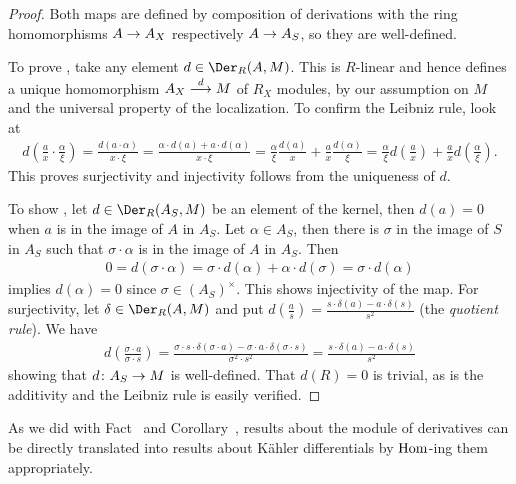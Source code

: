 \documentclass[a4paper,parskip=half,numbers=enddot, DIV=12, headheight=30pt]{scrreprt}
\begin{document}
\begin{proof}
    Both maps are defined by composition of derivations with the ring homomorphisms $A\morphism A_X$ respectively $A\morphism A_S$, so they are well-defined.
    
    To prove , take any element $d\in \Der_R(A,M)$. This is $R$-linear and hence defines a unique homomorphism $A_X\morphism[d] M$ of $R_X$ modules, by our assumption on $M$ and the universal property of the localization. To confirm the Leibniz rule, look at
    \begin{align*}
        d\left(\frac{a}{x}\cdot \frac{\alpha}{\xi}\right) = \frac{d(a\cdot\alpha)}{x\cdot \xi} = \frac{\alpha\cdot d(a) +a\cdot d(\alpha)}{x\cdot \xi} = \frac{\alpha}{\xi}\frac{d(a)}{x} +\frac{a}{x}\frac{d(\alpha)}{\xi} = \frac{\alpha}{\xi}d\left(\frac{a}{x}\right) +\frac{a}{x}d\left(\frac{\alpha}{\xi}\right).
    \end{align*}
    This proves surjectivity and injectivity follows from the uniqueness of $d$.
    
    To show , let $d\in\Der_R(A_S,M)$ be an element of the kernel, then $d(a)=0$ when $a$ is in the image of $A$ in $A_S$. Let $\alpha\in A_S$, then there is $\sigma$ in the image of $S$ in $A_S$ such that $\sigma\cdot \alpha$ is in the image of $A$ in $A_S$. Then 
    \begin{align*}
        0 = d(\sigma\cdot \alpha) = \sigma \cdot d(\alpha) + \alpha\cdot d(\sigma) = \sigma\cdot d(\alpha)
    \end{align*}
    implies $d(\alpha) = 0$ since $\sigma\in (A_S)^\times$. This shows injectivity of the map. For surjectivity, let $\delta\in \Der_R(A,M)$ and put $d\left(\frac{a}{s}\right) = \frac{s\cdot\delta(a) - a\cdot\delta(s)}{s^2}$ (the \emph{quotient rule}). We have
    \begin{align*}
        d\left(\frac{\sigma\cdot a}{\sigma \cdot s}\right) = \frac{\sigma\cdot s\cdot \delta(\sigma\cdot a) - \sigma \cdot a \cdot \delta(\sigma\cdot s)}{\sigma^2\cdot s^2} = \frac{s\cdot \delta(a)-a\cdot\delta(s)}{s^2}
    \end{align*}
    showing that $d\colon A_S\morphism M$ is well-defined. That $d(R)=0$ is trivial, as is the additivity and the Leibniz rule is easily verified.
\end{proof}
As we did with Fact~ and Corollary~, results about the module of derivatives can be directly translated into results about Kähler differentials by $\operatorname{Hom}$-ing them appropriately.
\end{document}
